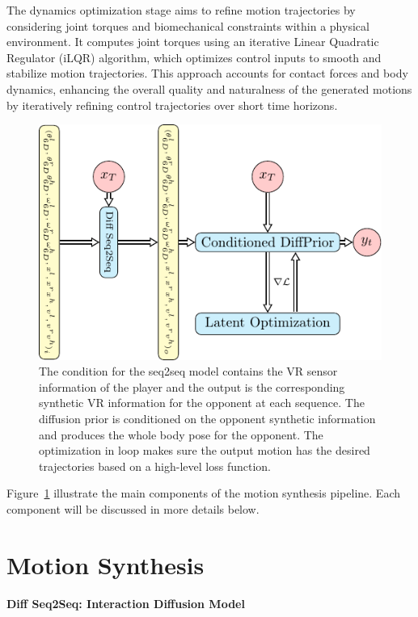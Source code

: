 \documentclass{egpubl}
\begin{document}
The dynamics optimization stage aims to refine motion trajectories by considering joint torques and biomechanical constraints within a physical environment. It computes joint torques using an iterative Linear Quadratic Regulator (iLQR) algorithm, which optimizes control inputs to smooth and stabilize motion trajectories. This approach accounts for contact forces and body dynamics, enhancing the overall quality and naturalness of the generated motions by iteratively refining control trajectories over short time horizons.

\begin{figure}[htbp]
  \centering
  \includegraphics{condiffusion}
  \caption{\label{fig:condition-diffusion}
           The condition for the seq2seq model contains the VR sensor information of the player and the output is the corresponding synthetic VR information for the opponent at each sequence. The diffusion prior is conditioned on the opponent synthetic information and produces the whole body pose for the opponent. The optimization in loop makes sure the output motion has the desired trajectories based on a high-level loss function.}
    \label{fig:condtion-diffusion}
\end{figure}

Figure~\ref{fig:condtion-diffusion} illustrate the main components of the motion synthesis pipeline. Each component will be discussed in more details below.



\section{Motion Synthesis}
\textbf{Diff Seq2Seq: Interaction Diffusion Model}
 
\end{document}
